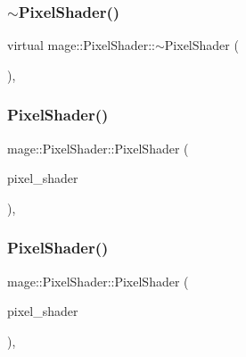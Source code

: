 \hypertarget{classmage_1_1_pixel_shader_ac339b9196db24d18143ad36013d598b2}{}\label{classmage_1_1_pixel_shader_ac339b9196db24d18143ad36013d598b2} 
\subsubsection{\texorpdfstring{$\sim$\+Pixel\+Shader()}{~PixelShader()}}
{\footnotesize\ttfamily virtual mage\+::\+Pixel\+Shader\+::$\sim$\+Pixel\+Shader (\begin{DoxyParamCaption}{ }\end{DoxyParamCaption})\hspace{0.3cm}{\ttfamily [virtual]}, {\ttfamily [default]}}

\hypertarget{classmage_1_1_pixel_shader_a361df943e40e9015ac4b769af130ce79}{}\label{classmage_1_1_pixel_shader_a361df943e40e9015ac4b769af130ce79} 
\subsubsection{\texorpdfstring{Pixel\+Shader()}{PixelShader()}\hspace{0.1cm}{\footnotesize\ttfamily [3/4]}}
{\footnotesize\ttfamily mage\+::\+Pixel\+Shader\+::\+Pixel\+Shader (\begin{DoxyParamCaption}\item[{const \hyperlink{classmage_1_1_pixel_shader}{Pixel\+Shader} \&}]{pixel\+\_\+shader }\end{DoxyParamCaption})\hspace{0.3cm}{\ttfamily [private]}, {\ttfamily [delete]}}

\hypertarget{classmage_1_1_pixel_shader_aea7c5c1888dda0317d6e98d0a57c41b0}{}\label{classmage_1_1_pixel_shader_aea7c5c1888dda0317d6e98d0a57c41b0} 
\subsubsection{\texorpdfstring{Pixel\+Shader()}{PixelShader()}\hspace{0.1cm}{\footnotesize\ttfamily [4/4]}}
{\footnotesize\ttfamily mage\+::\+Pixel\+Shader\+::\+Pixel\+Shader (\begin{DoxyParamCaption}\item[{\hyperlink{classmage_1_1_pixel_shader}{Pixel\+Shader} \&\&}]{pixel\+\_\+shader }\end{DoxyParamCaption})\hspace{0.3cm}{\ttfamily [private]}, {\ttfamily [delete]}}



